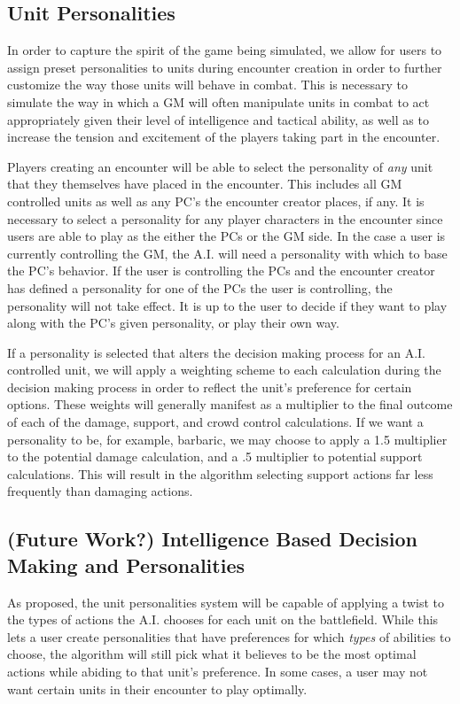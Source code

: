 \documentclass[12pt,a4paper]{report}
\begin{document}
		\subsection{Unit Personalities}
		In order to capture the spirit of the game being simulated, we allow for users to assign preset personalities to units during encounter creation in order to further customize the way those units will behave in combat. This is necessary to simulate the way in which a GM will often manipulate units in combat to act appropriately given their level of intelligence and tactical ability, as well as to increase the tension and excitement of the players taking part in the encounter. 
		
		Players creating an encounter will be able to select the personality of \textit{any} unit that they themselves have placed in the encounter. This includes all GM controlled units as well as any PC's the encounter creator places, if any. It is necessary to select a personality for any player characters in the encounter since users are able to play as the either the PCs or the GM side. In the case a user is currently controlling the GM, the A.I. will need a personality with which to base the PC's behavior. If the user is controlling the PCs and the encounter creator has defined a personality for one of the PCs the user is controlling, the personality will not take effect. It is up to the user to decide if they want to play along with the PC's given personality, or play their own way. 
		
		If a personality is selected that alters the decision making process for an A.I. controlled unit, we will apply a weighting scheme to each calculation during the decision making process in order to reflect the unit's preference for certain options. These weights will generally manifest as a multiplier to the final outcome of each of the damage, support, and crowd control calculations. If we want a personality to be, for example, barbaric, we may choose to apply a 1.5 multiplier to the potential damage calculation, and a .5 multiplier to potential support calculations. This will result in the algorithm selecting support actions far less frequently than damaging actions. 
		
		\subsection{(Future Work?) Intelligence Based Decision Making and Personalities}
		As proposed, the unit personalities system will be capable of applying a twist to the types of actions the A.I. chooses for each unit on the battlefield. While this lets a user create personalities that have preferences for which \textit{types} of abilities to choose, the algorithm will still pick what it believes to be the most optimal actions while abiding to that unit's preference. In some cases, a user may not want certain units in their encounter to play optimally. 
		
\end{document}
